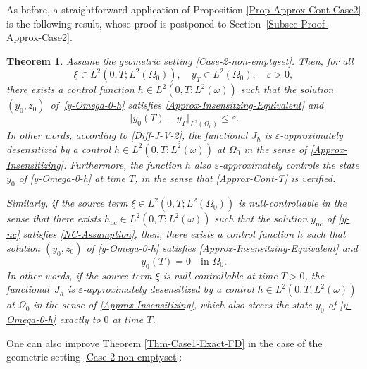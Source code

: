 \documentclass[JEP,XML,SOM,Unicode,NoFloatCountersInSection]{cedram}
\newcommand{\nc}{\mathrm{nc}}
\newcommand{\norm}[1]{\Vert#1\Vert}
\newtheorem{theorem}{Theorem}[section]
\theoremstyle{definition}
\begin{document}
As before, a straightforward application of Proposition \ref{Prop-Approx-Cont-Case2} is the following result, whose proof is postponed to Section~\ref{Subsec-Proof-Approx-Case2}.

\begin{theorem}
\label{Thm-Approx-Case2}
Assume the geometric setting \eqref{Case-2-non-emptyset}. Then, for all
\[
\xi \in L^2(0,T; L^2(\Omega_0)), \quad y_T \in L^2(\Omega_0),\quad\varepsilon >0,
\]
there exists a control function $h\!\!\in\!L^2(0,T; L^2(\omega))$ such that the solution $(y_0,z_0)$~of~\eqref{y-Omega-0-h} satisfies \eqref{Approx-Insensitzing-Equivalent} and
\begin{equation}
\label{Approx-Cont-T}
\norm{y_0(T) - y_T}_{L^2(\Omega_0)} \leq \varepsilon.
\end{equation}
In other words, according to \eqref{Diff-J-V-2}, the functional $J_h$ is $\varepsilon$-approximately desensitized by a control $h \in L^2(0,T; L^2(\omega))$ at $\Omega_0$ in the sense of \eqref{Approx-Insensitizing}. Furthermore, the function $h$ also $\varepsilon$-approximately controls the state $y_0$ of \eqref{y-Omega-0-h} at time $T$, in the sense that \eqref{Approx-Cont-T} is verified.

Similarly, if {the source term} $\xi \in L^2(0,T; L^2(\Omega_0))$ is null-controllable in the sense that there exists $h_{\nc} \in L^2(0,T; L^2(\omega))$ such that the solution $y_{\nc}$ of \eqref{y-nc} satisfies \eqref{NC-Assumption}, then, there exists a control function $h$ such that solution $(y_0,z_0)$ of \eqref{y-Omega-0-h} satisfies \eqref{Approx-Insensitzing-Equivalent} and
\begin{equation}
\label{NC-and-Approx-Insenstizing}
y_0(T) = 0 \quad\text{in } \Omega_0.
\end{equation}
In other words, if {the source term} $\xi$ is null-controllable at time $T>0$, the functional~$J_h$ is $\varepsilon$-approximately desensitized by a control $h \in L^2(0,T; L^2(\omega))$ at $\Omega_0$ in the sense of \eqref{Approx-Insensitizing}, which also steers the state $y_0$ of \eqref{y-Omega-0-h} exactly to $0$ at time $T$.
\end{theorem}

One can also improve Theorem \ref{Thm-Case1-Exact-FD} in the case of the geometric setting \eqref{Case-2-non-emptyset}:
\end{document}
